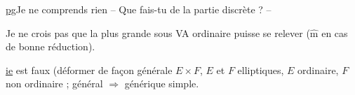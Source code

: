 \uline{pg}\quad Je ne comprends rien -- Que fais-tu de la partie discrète ? --

Je ne crois pas que la plus grande  sous VA ordinaire puisse se relever ($\hat{\mathrm m}$ en cas de bonne réduction).

\uline{ie} est faux (déformer de façon générale $E\times F$, $E$ et $F$ elliptiques, $E$ ordinaire, $F$ non ordinaire ; général $\Rightarrow$ générique simple.

\normalmarginpar
